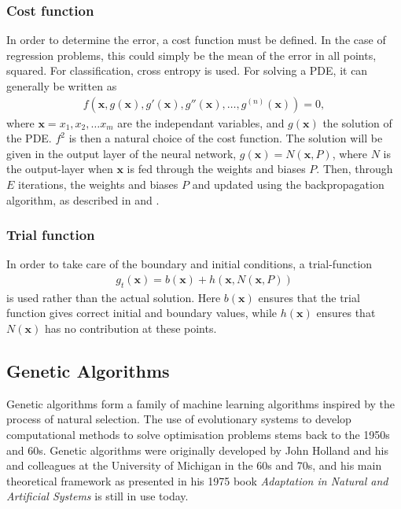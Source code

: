 \documentclass[multicolumn, 10pt]{extarticle}
\begin{document}
\subsubsection{Cost function}
In order to determine the error, a cost function must be defined. In the case of regression problems, this could simply be the mean of the error in all points, squared. For classification, cross entropy is used. For solving a PDE, it can generally be written as
\begin{align*}
	f(\mathbf{x}, g(\mathbf{x}), g'(\mathbf{x}), g''(\mathbf{x}), \dots, g^{(n)}(\mathbf{x})) = 0,
\end{align*}
where $\mathbf{x} = x_1, x_2, \dots x_m$ are the independant variables, and $g(\mathbf{x})$ the solution of the PDE. $f^2$ is then a natural choice of the cost function. The solution will be given in the output layer of the neural network, $g(\mathbf{x}) = N(\mathbf{x}, P)$, where $N$ is the output-layer when $\mathbf{x}$ is fed through the weights and biases $P$.
Then, through $E$ iterations, the weights and biases $P$ and updated using the backpropagation algorithm, as described in \cite{p2S} and \cite{p2HO}.

\subsubsection{Trial function}\label{sec:trialf}
In order to take care of the boundary and initial conditions, a trial-function
\begin{align*}
	g_t(\mathbf{x}) = b(\mathbf{x}) + h(\mathbf{x}, N(\mathbf{x}, P))
\end{align*}
is used rather than the actual solution. Here $b(\mathbf{x})$ ensures that the trial function gives correct initial and boundary values, while $h(\mathbf{x})$ ensures that $N(\mathbf{x})$ has no contribution at these points.




\subsection{Genetic Algorithms}
Genetic algorithms form a family of machine learning algorithms inspired by the process of natural selection. The use of evolutionary systems to develop computational methods to solve optimisation problems stems back to the 1950s and 60s. Genetic algorithms were originally developed by John Holland and his and colleagues at the University of Michigan in the 60s and 70s, and his main theoretical framework as presented in his 1975 book \textit{Adaptation in Natural and Artificial Systems} \cite{Holland} is still in use today.
\end{document}
